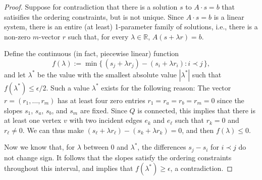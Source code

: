 \documentclass{patmorin}
\begin{document}
\begin{proof}
   Suppose for contradiction that there is a solution $s$ to $A\cdot s=b$ that satisifies the ordering
   constraints, %
   but is not unique.  Since $A\cdot s=b$ is a linear system, there is an entire (at least) 1-parameter family of solutions,
   i.e., there is a non-zero $m$-vector $r$ such that, for every
   $\lambda\in\mathbb R$, $A(s+\lambda r)=b$.


Define the continuous (in fact, piecewise linear) function
\begin{equation*}
  f(\lambda) := \min \{\, (s_j+\lambda r_j)-(s_i+\lambda r_i) : i \prec
  j\,\}
,
\end{equation*}
and let $\lambda^*$ be the value with the smallest absolute value
 $|\lambda^*|$ such that
 $f(\lambda^*)\le\epsilon/2$.
Such a value $\lambda^*$ exists for the following reason:
   The vector $r=(r_1,\ldots,r_m)$ has at least four zero entries
   $r_1=r_a=r_b=r_m=0$ since the slopes $s_1$, $s_a$, $s_b$, and $s_m$
   are fixed.
  Since $Q$ is connected, this implies
   that there is at least one vertex $v$ with two incident edges $e_k$
   and $e_\ell$ such that $r_k=0$ and $r_\ell\neq 0$. 
   We can thus make $(s_\ell+\lambda r_\ell)-(s_k+\lambda r_k)=0$,
and then $f(\lambda)\le0$.

Now we know that, for $\lambda$ between $0$ and $\lambda^*$,
the differences $s_j-s_i$ for $i\prec j$ do not change sign.
It follows that the slopes satisfy the ordering constraints throughout
this interval, and
    implies that $f(\lambda^*)\ge\epsilon$, a contradiction.
%
%
%
\end{proof}
\end{document}
